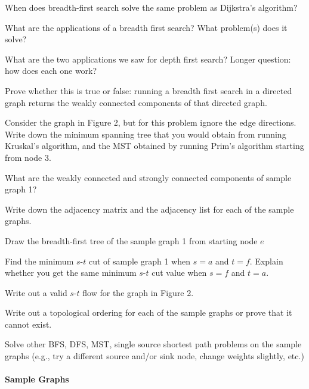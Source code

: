 \documentclass[11  pt]{exam}
\begin{document}
	\begin{questions}
		
		\question When does breadth-first search solve the same problem as Dijkstra's algorithm?
		
		\question What are the applications of a breadth first search? What problem(s) does it solve?
		
		\question What are the two applications we saw for depth first search? Longer question: how does each one work?
		
		\question Prove whether this is true or false: running a breadth first search in a directed graph returns the weakly connected components of that directed graph.
		
		\question Consider the graph in Figure 2, but for this problem ignore the edge directions. Write down the minimum spanning tree that you would obtain from running Kruskal's algorithm, and the MST obtained by running Prim's algorithm starting from node 3.
		
		
		\question What are the weakly connected and strongly connected components of sample graph 1?
		
		\question Write down the adjacency matrix and the adjacency list for each of the sample graphs.
		
		\question Draw the breadth-first tree of the sample graph 1 from starting node $e$
		
		\question Find the minimum $s$-$t$ cut of sample graph 1 when $s = a$ and $t = f$. Explain whether you get the same minimum $s$-$t$ cut value when $s = f$ and $t = a$.
		
		\question Write out a valid $s$-$t$ flow for the graph in Figure 2. 
		
		\question Write out a topological ordering for each of the sample graphs or prove that it cannot exist.
		
		\question Solve other BFS, DFS, MST, single source shortest path problems on the sample graphs (e.g., try a different source and/or sink node, change weights slightly, etc.)
		
		
		\paragraph{Sample Graphs}
		

\end{questions}
\end{document}
